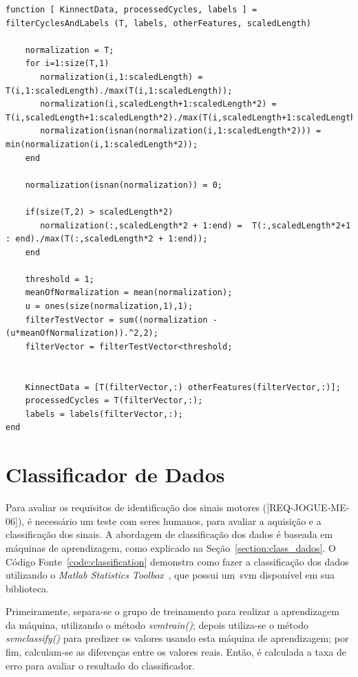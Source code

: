 	\begin{lstlisting}[frame=single, caption=Calcular Velociodade Angular Adução e Abdução, label=code:filtercycles]
function [ KinnectData, processedCycles, labels ] = filterCyclesAndLabels (T, labels, otherFeatures, scaledLength)

    normalization = T;
    for i=1:size(T,1)
       normalization(i,1:scaledLength) = T(i,1:scaledLength)./max(T(i,1:scaledLength));
       normalization(i,scaledLength+1:scaledLength*2) = T(i,scaledLength+1:scaledLength*2)./max(T(i,scaledLength+1:scaledLength*2));
       normalization(isnan(normalization(i,1:scaledLength*2))) = min(normalization(i,1:scaledLength*2));
    end
    
    normalization(isnan(normalization)) = 0;
    
    if(size(T,2) > scaledLength*2) 
       normalization(:,scaledLength*2 + 1:end) =  T(:,scaledLength*2+1 : end)./max(T(:,scaledLength*2 + 1:end));
    end
    
    threshold = 1;
    meanOfNormalization = mean(normalization);
    u = ones(size(normalization,1),1);
    filterTestVector = sum((normalization - (u*meanOfNormalization)).^2,2);
    filterVector = filterTestVector<threshold;
    
       
    KinnectData = [T(filterVector,:) otherFeatures(filterVector,:)];
    processedCycles = T(filterVector,:);
    labels = labels(filterVector,:);    
end
\end{lstlisting}	


\section{Classificador de Dados}
Para avaliar os requisitos de identificação dos sinais motores ([REQ-JOGUE-ME-06]), é necessário um teste com seres humanos, para avaliar a aquisição e a classificação dos sinais. A abordagem de classificação dos dados é baseada em máquinas de aprendizagem, como explicado na Seção~\ref{section:class_dados}. O Código Fonte~\ref{code:classification} demonstra como fazer a classificação dos dados utilizando o \textit{Matlab Statistics Toolbox}~\cite{matlab2011}, que possui um~\ac{svm} disponível em sua biblioteca.

Primeiramente, separa-se o grupo de treinamento para realizar a aprendizagem da máquina, utilizando o método \textit{svmtrain()}; depois utiliza-se o método \textit{svmclassify()} para predizer os valores usando esta máquina de aprendizagem; por fim, calculam-se as diferenças entre os valores reais. Então, é calculada a taxa de erro para avaliar o resultado do classificador.

